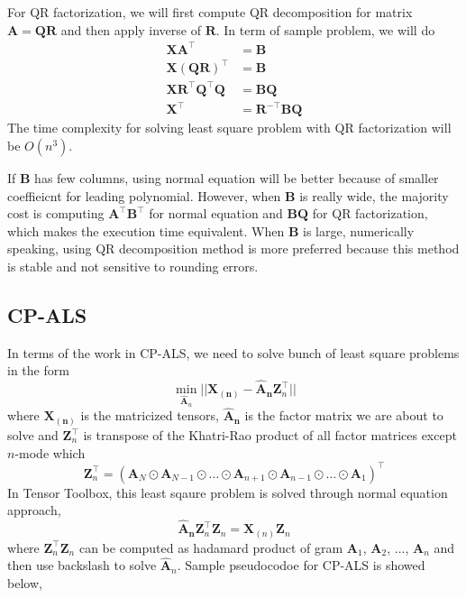 \documentclass{article}
\newcommand{\mat}[1]{\mathbf{#1}}
\begin{document}
For QR factorization, we will first compute QR decomposition for matrix $\mat{A} = \mat{Q}\mat{R}$ and then apply inverse of $\mat{R}$. In term
of sample problem, we will do
\begin{align}
  \mat{X}\mat{A}^\top &= \mat{B} \nonumber \\
  \mat{X}(\mat{Q}\mat{R})^\top &= \mat{B} \nonumber \\
  \mat{X}\mat{R}^\top\mat{Q}^\top\mat{Q} &= \mat{B}\mat{Q} \nonumber \\
  \mat{X}^\top &= \mat{R}^{-\top}\mat{B}\mat{Q} \nonumber
\end{align} 
The time complexity for solving least square problem with QR factorization will be $O(n^3)$.


If $\mat{B}$ has few columns, using normal equation will be better because of smaller coeffieicnt
for leading polynomial. However, when $\mat{B}$ is really wide, the majority cost 
is computing $\mat{A}^\top\mat{B}^\top$ for normal equation and $\mat{B}\mat{Q}$ for QR factorization, 
which makes the execution time equivalent.
When $\mat{B}$ is large, numerically speaking, using QR decomposition method is more preferred because this method is stable
and not sensitive to rounding errors.







\subsection{CP-ALS}
In terms of the work in CP-ALS, we need to solve bunch of least square problems in the form 
$$\min_{\mat{\hat{A}}_n}||\mat{X_{(n)}} - {\mat{\hat{A}_n}}\mat{Z}^\top_n ||$$
where $\mat{X_{(n)}}$ is the matricized tensors, $\mat{\hat{A}_n}$ is the factor matrix we are about to solve and 
$\mat{Z}^\top_n$ is transpose of the Khatri-Rao product of all factor matrices except $n$-mode which
$$\mat{Z}^\top_n = (\mat{A}_N \odot \mat{A}_{N-1} \odot \dots \odot \mat{A}_{n+1} \odot \mat{A}_{n-1} \odot \dots \odot \mat{A}_1)^\top $$ 
In Tensor Toolbox, this least sqaure problem is solved through normal equation approach,
$$\mat{\hat{A}_n}\mat{Z}_n^\top\mat{Z}_n = \mat{X}_{(n)}\mat{Z}_n$$
where $\mat{Z}_n^\top\mat{Z}_n$ can be computed as hadamard product of gram $\mat{A}_{1}$, $\mat{A}_{2}$, $\dots$, $\mat{A}_{n}$
and then use backslash to solve $\mat{\hat{A}}_n$. Sample pseudocodoe for CP-ALS is showed below,
\end{document}
